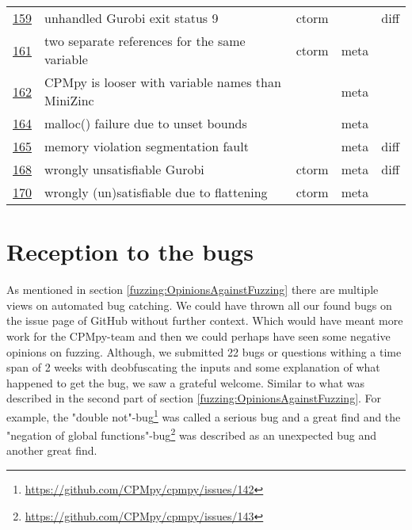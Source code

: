 \begin{table}[]
\begin{tabular}{lllll}
		\href{https://github.com/CPMpy/cpmpy/issues/159}{159} & unhandled Gurobi exit status 9                    & ctorm &       & diff \\
		\href{https://github.com/CPMpy/cpmpy/issues/161}{161} & two separate references for the same variable     & ctorm & meta  &      \\
		\href{https://github.com/CPMpy/cpmpy/issues/162}{162} & CPMpy is looser with variable names than MiniZinc &       & meta  &      \\
		\href{https://github.com/CPMpy/cpmpy/issues/164}{164} & malloc() failure due to unset bounds              &       & meta  &      \\
		\href{https://github.com/CPMpy/cpmpy/issues/165}{165} & memory violation segmentation fault               &       & meta  & diff \\
		\href{https://github.com/CPMpy/cpmpy/issues/168}{168} & wrongly unsatisfiable Gurobi                      & ctorm & meta  & diff \\
		\href{https://github.com/CPMpy/cpmpy/issues/170}{170} & wrongly (un)satisfiable due to flattening         & ctorm & meta  &      \\ \bottomrule
	\end{tabular}
\end{table}


\section{Reception to the bugs} 
\label{res:ReceptionToBug}
As mentioned in section \ref{fuzzing:OpinionsAgainstFuzzing} there are multiple views on automated bug catching. We could have thrown all our found bugs on the issue page of GitHub without further context. Which would have meant more work for the CPMpy-team and then we could perhaps have seen some negative opinions on fuzzing. 
Although, we submitted 22 bugs or questions withing a time span of 2 weeks with deobfuscating the inputs and some explanation of what happened to get the bug, we saw a grateful welcome. Similar to what was described in the second part of section \ref{fuzzing:OpinionsAgainstFuzzing}. 
For example, the "double not"-bug\footnote{\url{https://github.com/CPMpy/cpmpy/issues/142}} was called a serious bug and a great find and 
the "negation of global functions"-bug\footnote{\url{https://github.com/CPMpy/cpmpy/issues/143}} was described as an unexpected bug and another great find.

